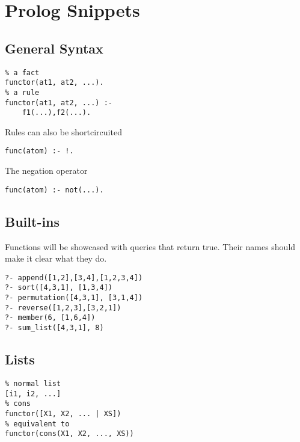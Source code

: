 \section{Prolog Snippets}
\subsection*{General Syntax}
\begin{verbatim}
% a fact
functor(at1, at2, ...).
% a rule
functor(at1, at2, ...) :-
    f1(...),f2(...).
\end{verbatim}
Rules can also be shortcircuited
\begin{verbatim}
func(atom) :- !.
\end{verbatim}
The negation operator
\begin{verbatim}
func(atom) :- not(...).
\end{verbatim}

\subsection*{Built-ins}
Functions will be showcased with queries that return true. Their
names should make it clear what they do.
\begin{verbatim}
?- append([1,2],[3,4],[1,2,3,4])
?- sort([4,3,1], [1,3,4])
?- permutation([4,3,1], [3,1,4])
?- reverse([1,2,3],[3,2,1])
?- member(6, [1,6,4])
?- sum_list([4,3,1], 8)
\end{verbatim}

\subsection*{Lists}
\begin{verbatim}
% normal list
[i1, i2, ...]
% cons
functor([X1, X2, ... | XS])
% equivalent to 
functor(cons(X1, X2, ..., XS))
\end{verbatim}